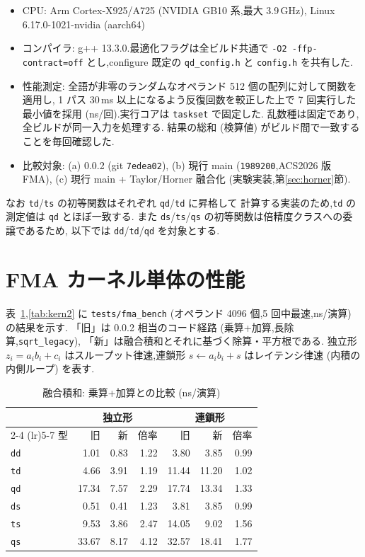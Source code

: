 \documentclass[a4paper,10pt]{ltjsarticle}
\begin{document}
\begin{itemize}
  \item CPU: Arm Cortex-X925/A725 (NVIDIA GB10 系,最大 3.9\,GHz),
        Linux 6.17.0-1021-nvidia (aarch64)
  \item コンパイラ: g++ 13.3.0.最適化フラグは全ビルド共通で
        \texttt{-O2 -ffp-contract=off} とし,configure 既定の
        \texttt{qd\_config.h} と \texttt{config.h} を共有した.
  \item 性能測定: 全語が非零のランダムなオペランド 512 個の配列に対して関数を適用し,
        1 パス 30\,ms 以上になるよう反復回数を較正した上で 7 回実行した最小値を採用
        (ns/回).実行コアは \texttt{taskset} で固定した.
        乱数種は固定であり,全ビルドが同一入力を処理する.
        結果の総和 (検算値) がビルド間で一致することを毎回確認した.
  \item 比較対象: (a) 0.0.2 (git \texttt{7edea02}),
        (b) 現行 main (\texttt{1989200},ACS2026 版 FMA),
        (c) 現行 main + Taylor/Horner 融合化 (実験実装,第\ref{sec:horner}節).
\end{itemize}

なお \texttt{td}/\texttt{ts} の初等関数はそれぞれ \texttt{qd}/\texttt{td} に昇格して
計算する実装のため,\texttt{td} の測定値は \texttt{qd} とほぼ一致する.
また \texttt{ds}/\texttt{ts}/\texttt{qs} の初等関数は倍精度クラスへの委譲であるため,
以下では \texttt{dd}/\texttt{td}/\texttt{qd} を対象とする.

\section{FMA カーネル単体の性能}

表~\ref{tab:kern1},\ref{tab:kern2} に \texttt{tests/fma\_bench}
(オペランド 4096 個,5 回中最速,ns/演算) の結果を示す.
「旧」は 0.0.2 相当のコード経路 (乗算+加算,長除算,\texttt{sqrt\_legacy}),
「新」は融合積和とそれに基づく除算・平方根である.
独立形 $z_i = a_i b_i + c_i$ はスループット律速,連鎖形 $s \gets a_i b_i + s$
はレイテンシ律速 (内積の内側ループ) を表す.

\begin{table}[htbp]
\centering
\caption{融合積和: 乗算+加算との比較 (ns/演算)}
\label{tab:kern1}
\begin{tabular}{l rrr rrr}
\toprule
 & \multicolumn{3}{c}{独立形} & \multicolumn{3}{c}{連鎖形} \\
\cmidrule(lr){2-4} \cmidrule(lr){5-7}
型 & 旧 & 新 & 倍率 & 旧 & 新 & 倍率 \\
\midrule
\texttt{dd} & 1.01 & 0.83 & 1.22 & 3.80 & 3.85 & 0.99 \\
\texttt{td} & 4.66 & 3.91 & 1.19 & 11.44 & 11.20 & 1.02 \\
\texttt{qd} & 17.34 & 7.57 & 2.29 & 17.74 & 13.34 & 1.33 \\
\texttt{ds} & 0.51 & 0.41 & 1.23 & 3.81 & 3.85 & 0.99 \\
\texttt{ts} & 9.53 & 3.86 & 2.47 & 14.05 & 9.02 & 1.56 \\
\texttt{qs} & 33.67 & 8.17 & 4.12 & 32.57 & 18.41 & 1.77 \\
\bottomrule
\end{tabular}
\end{table}
\end{document}
